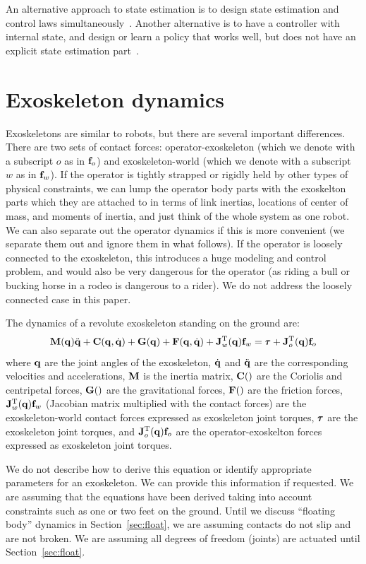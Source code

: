 \documentclass[letterpaper,12pt,fullpage]{article}
\begin{document}
An alternative approach to state estimation is to design state estimation
and control laws simultaneously~\cite{LQG-LTR}. Another alternative is
to have a controller with internal state, and design or learn a policy
that works well, but does not have an explicit state estimation 
part~\cite{lead-lag}.

\section{Exoskeleton dynamics}

Exoskeletons are similar to robots, but there are several important differences.
There are two sets of contact forces: operator-exoskeleton (which we denote
with a subscript $o$ as in ${\bf f}_o$) and exoskeleton-world (which we denote
with a subscript $w$ as in ${\bf f}_w$). If the operator is tightly strapped or
rigidly held by other types of physical constraints, we can lump the operator
body parts with the exoskelton parts which they are attached to in terms
of link inertias, locations of center of mass, and moments of inertia,
and just think of the whole system as one robot.
We can also separate out the operator dynamics if this is more convenient
(we separate them out and ignore them in what follows).
If the operator is loosely connected to the exoskeleton, this introduces a
huge modeling and control problem, and would also be very dangerous for the
operator (as riding a bull or bucking horse in a rodeo is dangerous to a rider).
We do not address the loosely connected case in this paper.

The dynamics of a revolute exoskeleton standing on the ground are:
\begin{equation}
\mM(\vq) \ddot{\vq} + \mC(\vq,\dot{\vq}) + \mG(\vq) + \mF(\vq,\dot{\vq})
+ \mJ_w^{\tr}(\vq) \vf_w = \vtau + \mJ_o^{\tr}(\vq) \vf_o
\label{eq:dynamics}
\end{equation}
where ${\bf q}$ are the joint angles of
the exoskeleton, $\dot{{\bf q}}$ and $\ddot{{\bf q}}$ are the corresponding
velocities and accelerations, ${\bf M}$ is the inertia matrix, ${\bf C}()$ are the Coriolis and
centripetal forces, ${\bf G}()$ are the gravitational forces, ${\bf F}()$ are the
friction forces, ${\bf J}_w^{{\rm T}}({\bf q}) {\bf f}_w$ (Jacobian matrix multiplied with the
contact forces)
are the exoskeleton-world
contact forces 
expressed as exoskeleton joint torques, 
$\vtau$ are the exoskeleton
joint torques,
and ${\bf J}_o^{{\rm T}}({\bf q}) {\bf f}_o$
are the operator-exoskelton forces expressed
as exoskeleton joint torques.

We do not describe how to derive this equation or identify appropriate parameters
for an exoskeleton. We can provide this information if requested.
We are assuming that the equations have been derived taking into account constraints
such as one or two feet on the ground. Until we discuss ``floating body'' dynamics
in Section~\ref{sec:float}, we are assuming contacts do not slip and are not broken.
We are assuming all degrees of freedom (joints) are actuated until 
Section~\ref{sec:float}.
\end{document}
